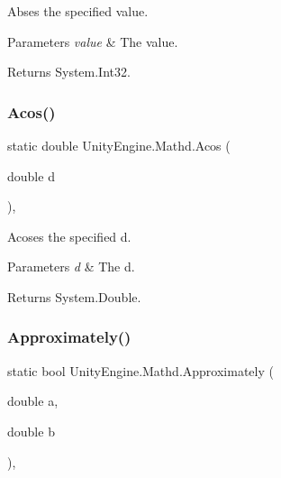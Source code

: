 Abses the specified value. 


\begin{DoxyParams}{Parameters}
{\em value} & The value.\\
\hline
\end{DoxyParams}
\begin{DoxyReturn}{Returns}
System.\+Int32.
\end{DoxyReturn}
\mbox{\label{struct_unity_engine_1_1_mathd_adf9655c29b2d0dc3c32b5e9ec81648f0}} 
\subsubsection{\texorpdfstring{Acos()}{Acos()}}
{\footnotesize\ttfamily static double Unity\+Engine.\+Mathd.\+Acos (\begin{DoxyParamCaption}\item[{double}]{d }\end{DoxyParamCaption})\hspace{0.3cm}{\ttfamily [inline]}, {\ttfamily [static]}}



Acoses the specified d. 


\begin{DoxyParams}{Parameters}
{\em d} & The d.\\
\hline
\end{DoxyParams}
\begin{DoxyReturn}{Returns}
System.\+Double.
\end{DoxyReturn}
\mbox{\label{struct_unity_engine_1_1_mathd_a92aed1efcb52271af008e51bf69ce729}} 
\subsubsection{\texorpdfstring{Approximately()}{Approximately()}}
{\footnotesize\ttfamily static bool Unity\+Engine.\+Mathd.\+Approximately (\begin{DoxyParamCaption}\item[{double}]{a,  }\item[{double}]{b }\end{DoxyParamCaption})\hspace{0.3cm}{\ttfamily [inline]}, {\ttfamily [static]}}



